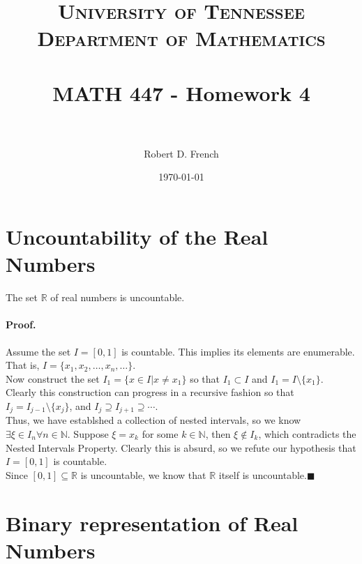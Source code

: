 \documentclass[paper=a4, fontsize=11pt]{scrartcl} %
\title{	
\normalfont \normalsize 
\textsc{University of Tennessee \\ Department of Mathematics} \\ [25pt] %
\horrule{0.5pt} \\[0.4cm] %
\huge MATH 447 - Homework 4 \\ %
\horrule{2pt} \\[0.5cm] %
}
\author{Robert D. French} %
\date{\normalsize\today} %
\numberwithin{equation}{section} %
\numberwithin{figure}{section} %
\numberwithin{table}{section} %
\begin{document}
\maketitle %


\section{Uncountability of the Real Numbers}

The set $\mathbb{R}$ of real numbers is uncountable.

\paragraph{Proof.}

Assume the set $I=[0,1]$ is countable. This implies its elements are enumerable. That is, $I=\{x_1,x_2,\ldots,x_n,\ldots\}$.\\

Now construct the set $I_1=\{x \in I | x \neq x_1\}$ so that $I_1 \subset I$ and $ I_1 = I \setminus \{x_1\}$. Clearly this construction can progress in a recursive fashion so that $I_j = I_{j-1} \setminus \{x_j\}$, and $I_j \supseteq I_{j+1} \supseteq \cdots$.\\

Thus, we have establshed a collection of nested intervals, so we know $\exists \xi \in I_n \forall n \in \mathbb{N}$. Suppose $\xi = x_k$ for some $k \in \mathbb{N}$, then $\xi \notin I_k$, which contradicts the Nested Intervals Property. Clearly this is absurd, so we refute our hypothesis that $I=[0,1]$ is countable.\\

Since $[0,1] \subseteq \mathbb{R}$ is uncountable, we know that $\mathbb{R}$ itself is uncountable.$\blacksquare$


\section{Binary representation of Real Numbers}
\end{document}

